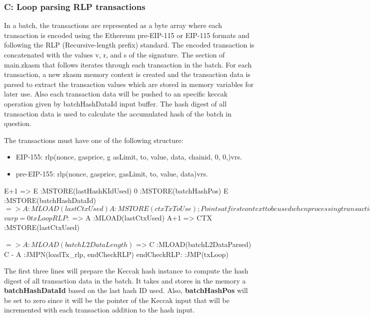 \subsubsection{C: Loop parsing RLP transactions}


In a batch, the transactions are represented as a byte array where each transaction is encoded using the Ethereum pre-EIP-115 or EIP-115 formats and following the RLP (Recursive-length prefix) standard. The encoded transaction is concatenated with the values v, r, and s of the signature. The section of main.zkasm that follows iterates through each transaction in the batch. For each transaction, a new zkasm memory context is created and the transaction data is parsed to extract the transaction values which are stored in memory variables for later use. Also each transaction data will be pushed to an specific keccak operation given by batchHashDataId  input buffer. The hash digest of all transaction data is used to calculate the accumulated hash of the batch in question.

The transactions must have one of the following structure:
\begin{itemize}
    \item EIP-155: rlp(nonce, gasprice, g asLimit, to, value, data, chainid, 0, 0,)vrs.
    \item pre-EIP-155: rlp(nonce, gasprice, gasLimit, to, value, data)vrs.
\end{itemize}



\begin{zkasm}
    E+1 => E                            :MSTORE(lastHashKIdUsed)
    0                                   :MSTORE(batchHashPos)
    E                                   :MSTORE(batchHashDataId)
    $ => A                              :MLOAD(lastCtxUsed)
    A                                   :MSTORE(ctxTxToUse) ; Points at first context to be used when processing transactions
    
    $${var p = 0}
    
    txLoopRLP:
    $ => A          :MLOAD(lastCtxUsed)
    A+1 => CTX      :MSTORE(lastCtxUsed)
    
    $ => A          :MLOAD(batchL2DataLength)
    $ => C          :MLOAD(batchL2DataParsed)
    C - A           :JMPN(loadTx_rlp, endCheckRLP)
    endCheckRLP:
    :JMP(txLoop)
\end{zkasm}

The first three lines will prepare the Keccak hash instance to compute the hash digest of all transaction data in the batch. It takes and stores in the memory a \textbf{batchHashDataId} based on the last hash ID used. Also, \textbf{batchHashPos} will be set to zero since it will be the pointer of the Keccak input that will be incremented with each transaction addition to the hash input.

